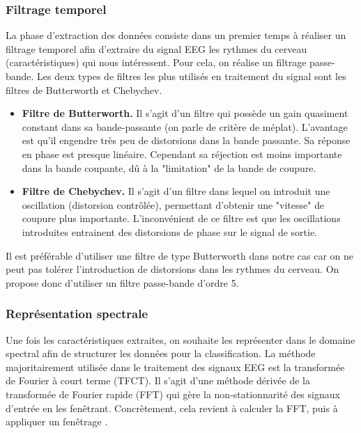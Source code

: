 \subsubsection{Filtrage temporel}
\label{Subsub : 4.Méthodes d'extraction des caractéristiques}
La phase d'extraction des données consiste dans un premier temps à réaliser un filtrage temporel afin d'extraire du signal EEG les rythmes du cerveau (caractéristiques) qui nous intéressent. Pour cela, on réalise un filtrage passe-bande. Les deux types de filtres les plus utilisés en traitement du signal sont les filtres de Butterworth et Chebychev. 

\begin{itemize}
	\item \textbf{Filtre de Butterworth.} Il s'agit d'un filtre qui possède un gain quasiment constant dans sa bande-passante (on parle de critère de méplat). L'avantage est qu'il engendre très peu de distorsions dans la bande passante. Sa réponse en phase est presque linéaire. Cependant sa réjection est moins importante dans la bande coupante, dû à la "limitation" de la bande de coupure.
	\smallbreak
	\item \textbf{Filtre de Chebychev.} Il s'agit d'un filtre dans lequel on introduit une oscillation (distorsion contrôlée), permettant d'obtenir une "vitesse" de coupure plus importante. L'inconvénient de ce filtre est que les oscillations introduites entrainent des distorsions de phase sur le signal de sortie. 
	\smallbreak
\end{itemize}

Il est préférable d'utiliser une filtre de type Butterworth dans notre cas car on ne peut pas tolérer l'introduction de distorsions dans les rythmes du cerveau. On propose donc d'utiliser un filtre passe-bande d'ordre 5.

\subsubsection{Représentation spectrale}

Une fois les caractéristiques extraites, on souhaite les représenter dans le domaine spectral afin de structurer les données pour la classification. La méthode majoritairement utilisée dans le traitement des signaux EEG est la transformée de Fourier à court terme (TFCT). Il s'agit d'une méthode dérivée de la transformée de Fourier rapide (FFT) qui gère la non-stationnarité des signaux d'entrée en les fenêtrant. Concrètement, cela revient à calculer la FFT, puis à appliquer un fenêtrage \cite{feature}.
 
